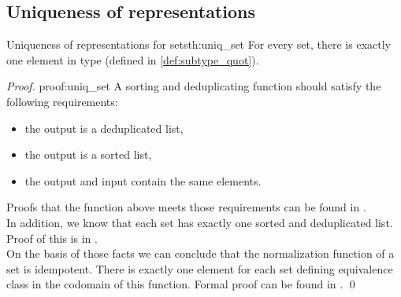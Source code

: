 \subsection{Uniqueness of representations}
\begin{theo}{Uniqueness of representations for sets}{th:uniq_set}
For every set, there is exactly one element in  type (defined in \ref{def:subtype_quot}). 
\end{theo}
\begin{proof}{}{proof:uniq_set}
A sorting and deduplicating function should satisfy the following requirements:
\begin{itemize}
    \itemsep 0em 
    \item the output is a deduplicated list,
    \item the output is a sorted list,
    \item the output and input contain the same elements.
\end{itemize}
Proofs that the function above meets those requirements can be found in .\\
In addition, we know that each set has exactly one sorted and deduplicated list. Proof of this is in  .\\
On the basis of those facts we can conclude that the normalization function of a set is idempotent. There is exactly one element for each set defining equivalence class in the codomain of this function. Formal proof can be found in . \qed
\end{proof}